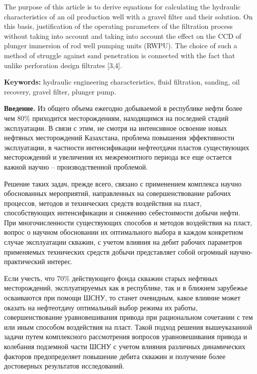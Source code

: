 The purpose of this article is to derive equations for calculating the
hydraulic characteristics of an oil production well with a gravel filter
and their solution. On this basis, justification of the operating
parameters of the filtration process without taking into account and
taking into account the effect on the CCD of plunger immersion of rod
well pumping units (RWPU). The choice of such a method of struggle
against sand penetration is connected with the fact that unlike
perforation design filtrates {[}3,4{]}.

{\bfseries Keywords:} hydraulic engineering characteristics, fluid
filtration, sanding, oil recovery, gravel filter, plunger pump.

\begin{multicols}{2}
{\bfseries Введение.} Из общего объема ежегодно добываемой в республике
нефти более чем 80\% приходится месторождениям, находящимся на последней
стадий эксплуатации. В связи с этим, не смотря на интенсивное освоение
новых нефтяных месторождений Казахстана, проблема повышения
эффективности эксплуатации, в частности интенсификации нефтеотдачи
пластов существующих месторождений и увеличения их межремонтного периода
все еще остается важной научно -- производственной проблемой.

Решение таких задач, прежде всего, связано с применением комплекса
научно обоснованных мероприятий, направленных на совершенствование
рабочих процессов, методов и технических средств воздействия на пласт,
способствующих интенсификации и снижению себестоимости добычи нефти. При
многочисленности существующих способов и методов воздействия на пласт,
вопрос о научном обосновании их оптимального выбора в каждом конкретном
случае эксплуатации скважин, с учетом влияния на дебит рабочих
параметров применяемых технических средств добычи представляет собой
огромный научно-практический интерес.

Если учесть, что 70\% действующего фонда скважин старых нефтяных
месторождений, эксплуатируемых как в республике, так и в ближнем
зарубежье осваиваются при помощи ШСНУ, то станет очевидным, какое
влияние может оказать на нефтеотдачу оптимальный выбор режима их работы,
совершенствование уравновешивания привода при рациональном сочетании с
тем или иным способом воздействия на пласт. Такой подход решения
вышеуказанной задачи путем комплексного рассмотрения вопросов
уравновешивания привода и колебания подземной части ШСНУ с учетом
влияния различных динамических факторов предопределяет повышение дебита
скважин и получение более достоверных результатов исследований.


\end{multicols}
